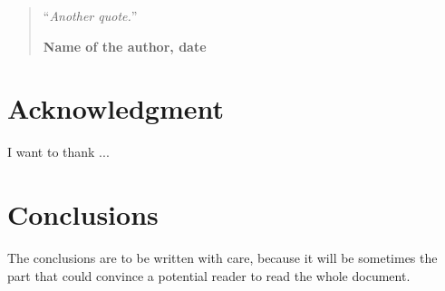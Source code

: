 \documentclass[11pt,a4paper,oneside]{book}
\begin{document}
\medskip

\begin{quotation}
\noindent ``\emph{Another quote.}''
\begin{flushright}\textbf{Name of the author, date}\end{flushright}
\end{quotation}
\chapter*{Acknowledgment}
\thispagestyle{empty}

\noindent I want to thank ...

\thispagestyle{empty}
\setcounter{page}{0}
\tableofcontents
\mainmatter
\setcounter{page}{1}








\chapter*{Conclusions}

The conclusions are to be written with care, because it will be sometimes the part that could convince a potential reader to read the whole document.

\appendix

\backmatter

\printindex %




\listoftodos
\end{document}
